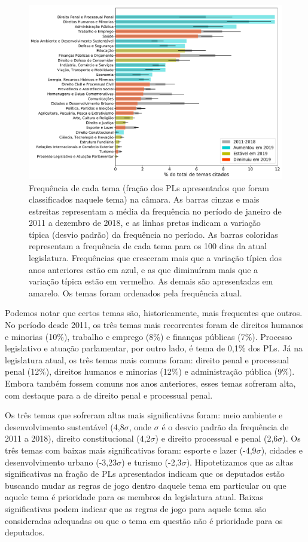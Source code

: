 \documentclass[12pt,a4paper]{article}
\begin{document}
\begin{figure}[H]
\centering
\includegraphics[width=1.0\textwidth]{graficos/temas_PL_fracao2019-vs-mediaAnterior_2019-05-03.pdf}
\caption{Frequência de cada tema (fração dos PLs apresentados que foram classificados naquele tema) na câmara.
  As barras cinzas e mais estreitas representam a média da frequência no período de janeiro de 2011 a
  dezembro de 2018, e as linhas pretas indicam a variação típica (desvio padrão) da frequência no período.
  As barras coloridas representam a frequência de cada tema para os 100 dias da atual legislatura.
  Frequências que cresceram mais que a variação típica dos anos anteriores estão em azul, e as que
  diminuíram mais que a variação típica estão em vermelho. As demais são apresentadas em amarelo.
  Os temas foram ordenados pela frequência atual.}
\label{fig:pl-por-tema-camara}
\end{figure}

Podemos notar que certos temas são, historicamente, mais frequentes que outros. No período desde 2011,
os três temas mais recorrentes foram de direitos humanos e minorias (10\%), trabalho e emprego (8\%)
e finanças públicas (7\%). Processo legislativo e atuação parlamentar, por outro lado, é tema de 0,1\%
dos PLs. Já na legislatura atual, os três temas mais comuns foram: direito penal e processual penal (12\%),
direitos humanos e minorias (12\%) e administração pública (9\%). Embora também fossem comuns nos anos
anteriores, esses temas sofreram alta, com destaque para a de direito penal e processual penal.

Os três temas que sofreram altas mais significativas foram: meio ambiente e desenvolvimento
sustentável (4,8$\sigma$, onde $\sigma$ é o desvio padrão da frequência de 2011 a 2018),
direito constitucional (4,2$\sigma$) e direito processual e penal (2,6$\sigma$). Os três
temas com baixas mais significativas foram: esporte e lazer (-4,9$\sigma$), cidades e desenvolvimento
urbano (-3,23$\sigma$) e turismo (-2,3$\sigma$). Hipotetizamos que as altas significativas
na fração de PLs apresentados indicam que os deputados estão buscando mudar as regras de jogo dentro
daquele tema em particular ou que aquele tema é prioridade para os membros da legislatura atual.
Baixas significativas podem indicar que as regras de jogo para aquele
tema são consideradas adequadas ou que o tema em questão não é prioridade para os deputados.
\end{document}
